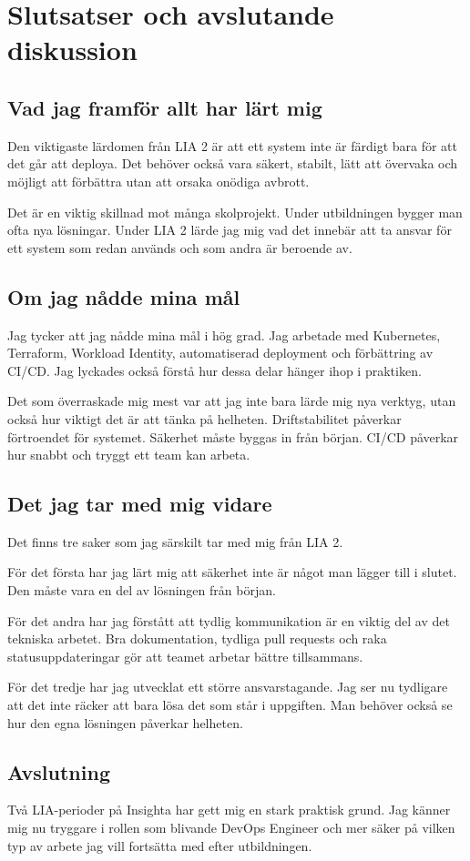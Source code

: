 \section{Slutsatser och avslutande diskussion}

\subsection*{Vad jag framför allt har lärt mig}

Den viktigaste lärdomen från LIA 2 är att ett system inte är färdigt bara för att det går att
deploya. Det behöver också vara säkert, stabilt, lätt att övervaka och möjligt att förbättra utan
att orsaka onödiga avbrott.

Det är en viktig skillnad mot många skolprojekt. Under utbildningen bygger man ofta nya
lösningar. Under LIA 2 lärde jag mig vad det innebär att ta ansvar för ett system som redan
används och som andra är beroende av.

\subsection*{Om jag nådde mina mål}

Jag tycker att jag nådde mina mål i hög grad. Jag arbetade med Kubernetes, Terraform,
Workload Identity, automatiserad deployment och förbättring av CI/CD. Jag lyckades också
förstå hur dessa delar hänger ihop i praktiken.

Det som överraskade mig mest var att jag inte bara lärde mig nya verktyg, utan också hur viktigt
det är att tänka på helheten. Driftstabilitet påverkar förtroendet för systemet. Säkerhet måste
byggas in från början. CI/CD påverkar hur snabbt och tryggt ett team kan arbeta.

\subsection*{Det jag tar med mig vidare}

Det finns tre saker som jag särskilt tar med mig från LIA 2.

För det första har jag lärt mig att säkerhet inte är något man lägger till i slutet. Den måste vara
en del av lösningen från början.

För det andra har jag förstått att tydlig kommunikation är en viktig del av det tekniska arbetet.
Bra dokumentation, tydliga pull requests och raka statusuppdateringar gör att teamet arbetar
bättre tillsammans.

För det tredje har jag utvecklat ett större ansvarstagande. Jag ser nu tydligare att det inte räcker
att bara lösa det som står i uppgiften. Man behöver också se hur den egna lösningen påverkar
helheten.

\subsection*{Avslutning}

Två LIA-perioder på Insighta har gett mig en stark praktisk grund. Jag känner mig nu tryggare i
rollen som blivande DevOps Engineer och mer säker på vilken typ av arbete jag vill fortsätta med
efter utbildningen.